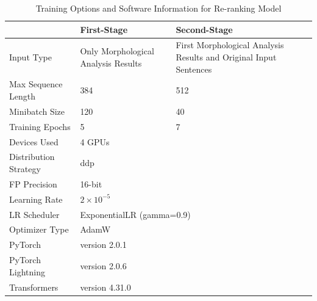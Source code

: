 \documentclass[AMS,STIX2COL]{WileyNJD-v2}
\begin{document}
    \begin{table}[ht]
        \centering
        \footnotesize
        \caption{Training Options and Software Information for Re-ranking Model}
        \label{tab:training-options}
        \begin{tabular}{|p{24mm}|p{25mm}|p{25mm}|}
            \hline
            ~                     & \textbf{First-Stage}                & \textbf{Second-Stage}                                        \\ \hline
            Input Type            & Only Morphological Analysis Results & First Morphological Analysis Results and Original Input Sentences \\ \hline
            Max Sequence Length   & 384                                 & 512                                                               \\ \hline
            Minibatch Size        & 120                                 & 40                                                                \\ \hline
            Training Epochs       & 5                                   & 7                                                                 \\ \hline
            Devices Used          & \multicolumn{2}{l|}{4 GPUs}                                                                             \\ \hline
            Distribution Strategy & \multicolumn{2}{l|}{ddp}                                                                                \\ \hline
            FP Precision          & \multicolumn{2}{l|}{16-bit}                                                                             \\ \hline
            Learning Rate         & \multicolumn{2}{l|}{$2 \times 10^{-5}$}                                                                 \\ \hline
            LR Scheduler          & \multicolumn{2}{l|}{ExponentialLR (gamma=0.9)}                                                          \\ \hline
            Optimizer Type        & \multicolumn{2}{l|}{AdamW}                                                                              \\ \hline
            PyTorch               & \multicolumn{2}{l|}{version 2.0.1}                                                                      \\ \hline
            PyTorch Lightning     & \multicolumn{2}{l|}{version 2.0.6}                                                                      \\ \hline
            Transformers          & \multicolumn{2}{l|}{version 4.31.0}                                                                     \\ \hline
        \end{tabular}
    \end{table}
\end{document}
